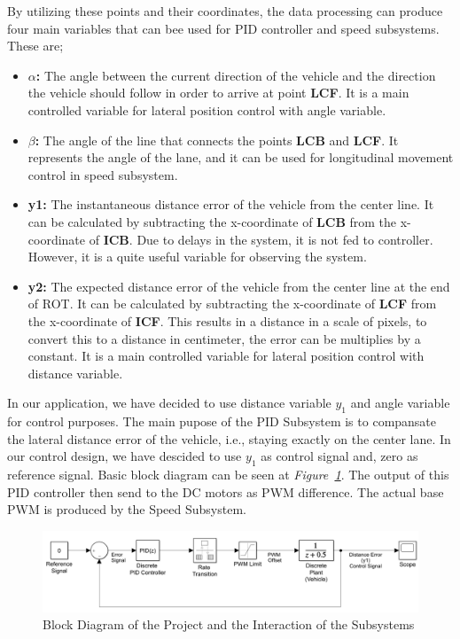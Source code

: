 \documentclass[a4paper,12pt]{article}
\begin{document}
\begin{enumerate}
	
	
	
	By utilizing these points and their coordinates, the data processing can produce four main variables that can bee used for PID controller and speed subsystems. These are;
	
	\begin{itemize}
		\item \textbf{$\alpha$:} The angle between the current direction of the vehicle and the direction the vehicle should follow in order to arrive at point \textbf{LCF}. It is a main controlled variable for lateral position control with angle variable.
		\item \textbf{$\beta$:} The angle of the line that connects the points \textbf{LCB} and \textbf{LCF}. It represents the angle of the lane, and it can be used for longitudinal movement control in speed subsystem.
		\item \textbf{y1:} The instantaneous distance error of the vehicle from the center line. It can be calculated by subtracting the x-coordinate of \textbf{LCB} from the x-coordinate of \textbf{ICB}. Due to delays in the system, it is not fed to controller. However, it is a quite useful variable for observing the system.  
		\item \textbf{y2:} The expected distance error of the vehicle from the center line at the end of ROT. It can be calculated by subtracting the x-coordinate of \textbf{LCF} from the x-coordinate of \textbf{ICF}. This results in a distance in a scale of pixels, to convert this to a distance in centimeter, the error can be multiplies by a constant. It is a main controlled variable for lateral position control with distance variable.
	\end{itemize}	 			
	
	
	
	In our application, we have decided to use distance variable $y_1$ and angle variable for control purposes. The main pupose of the PID Subsystem is to compansate the lateral distance error of the vehicle, i.e., staying exactly on the center lane. In our control design, we have descided to use $y_1$ as control signal and, zero as reference signal. Basic block diagram can be seen at \textit{Figure~\ref{fig:blockdiagram}}. The output of this PID controller then send to the DC motors as PWM difference. The actual base PWM is produced by the Speed Subsystem.
	
	
	\begin{figure}[h]
		\includegraphics[width=\textwidth,center]{images/simulink/Block_diagram}
		\caption{Block Diagram of the Project and the Interaction of the Subsystems}\label{fig:blockdiagram}
	\end{figure}
	

\end{enumerate}
\end{document}
